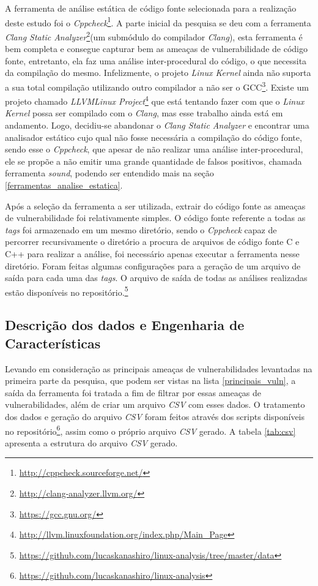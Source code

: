 A ferramenta de análise estática de código fonte selecionada para a realização
deste estudo foi o
\textit{Cppcheck}\footnote{\url{http://cppcheck.sourceforge.net/}}.  A parte
inicial da pesquisa se deu com a ferramenta \textit{Clang Static
Analyzer}\footnote{\url{http://clang-analyzer.llvm.org/}}(um submódulo do
compilador \textit{Clang}), esta ferramenta é bem completa e consegue capturar
bem as ameaças de vulnerabilidade de código fonte, entretanto, ela faz uma
análise inter-procedural do código, o que necessita da compilação do mesmo.
Infelizmente, o projeto \textit{Linux Kernel} ainda não suporta a sua total
compilação utilizando outro compilador a não ser o
GCC\footnote{\url{https://gcc.gnu.org/}}. Existe um projeto chamado
\textit{LLVMLinux
Project}\footnote{\url{http://llvm.linuxfoundation.org/index.php/Main_Page}} que
está tentando fazer com que o \textit{Linux Kernel} possa ser compilado com o
\textit{Clang}, mas esse trabalho ainda está em andamento. Logo, decidiu-se
abandonar o \textit{Clang Static Analyzer} e encontrar uma analisador estático
cujo qual não fosse necessária a compilação do código fonte, sendo esse o
\textit{Cppcheck}, que apesar de não realizar uma análise inter-procedural, ele
se propõe a não emitir uma grande quantidade de falsos positivos, chamada
ferramenta \textit{sound}, podendo ser entendido mais na seção
\ref{ferramentas_analise_estatica}.

Após a seleção da ferramenta a ser utilizada, extrair do código fonte as
ameaças de vulnerabilidade foi relativamente simples. O código fonte referente a
todas as \textit{tags} foi armazenado em um mesmo diretório, sendo o
\textit{Cppcheck} capaz de percorrer recursivamente o diretório a procura de
arquivos de código fonte C e C++ para realizar a análise, foi necessário apenas
executar a ferramenta nesse diretório. Foram feitas algumas configurações para a
geração de um arquivo de saída para cada uma das \textit{tags}. O arquivo de
saída de todas as análises realizadas estão disponíveis no
repositório.\footnote{\url{https://github.com/lucaskanashiro/linux-analysis/tree/master/data}}

\subsection{Descrição dos dados e Engenharia de Características}

Levando em consideração as principais ameaças de vulnerabilidades levantadas na
primeira parte da pesquisa, que podem ser vistas na lista \ref{principais_vuln},
a saída da ferramenta foi tratada a fim de filtrar por essas ameaças de
vulnerabilidades, além de criar um arquivo \textit{CSV} com esses dados. O
tratamento dos dados e geração do arquivo \textit{CSV} foram feitos através dos
scripts disponíveis no
repositório\footnote{\url{https://github.com/lucaskanashiro/linux-analysis}},
assim como o próprio arquivo \textit{CSV} gerado. A tabela \ref{tab:csv}
apresenta a estrutura do arquivo \textit{CSV} gerado.

